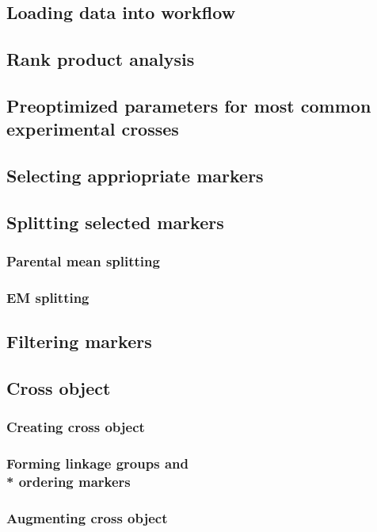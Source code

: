 \documentclass{article}
\begin{document}
\begin{multicols}{2}
\subsection{Loading data into workflow}
\blindtext
\subsection{Rank product analysis}
\blindtext
\subsection{Preoptimized parameters for most common experimental crosses}
\blindtext
\subsection{Selecting appriopriate markers}
\blindtext
\subsection{Splitting selected markers}
\subsubsection{Parental mean splitting}
\blindtext
\subsubsection{EM splitting}
\blindtext
\subsection{Filtering markers}
\blindtext
\subsection{Cross object}
\blindtext
\subsubsection{Creating cross object}
\blindtext
\subsubsection{Forming linkage groups and \\* ordering markers}
\blindtext
\subsubsection{Augmenting cross object}
\blindtext
\end{multicols}
\newpage
\end{document}
